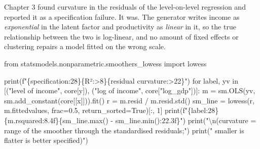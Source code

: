 \documentclass[
  letterpaper,
  10pt,
  twoside,
  openright,
  numbers=noenddot,
  chapterprefix=true]{scrbook}
\newenvironment{Shaded}{}{}
\newcommand{\BuiltInTok}[1]{\textcolor[rgb]{0.84,0.23,0.29}{#1}}
\newcommand{\CharTok}[1]{\textcolor[rgb]{0.01,0.18,0.38}{#1}}
\newcommand{\ControlFlowTok}[1]{\textcolor[rgb]{0.84,0.23,0.29}{#1}}
\newcommand{\DecValTok}[1]{\textcolor[rgb]{0.00,0.36,0.77}{#1}}
\newcommand{\FloatTok}[1]{\textcolor[rgb]{0.00,0.36,0.77}{#1}}
\newcommand{\ImportTok}[1]{\textcolor[rgb]{0.01,0.18,0.38}{#1}}
\newcommand{\KeywordTok}[1]{\textcolor[rgb]{0.84,0.23,0.29}{#1}}
\newcommand{\NormalTok}[1]{\textcolor[rgb]{0.14,0.16,0.18}{#1}}
\newcommand{\OperatorTok}[1]{\textcolor[rgb]{0.14,0.16,0.18}{#1}}
\newcommand{\SpecialCharTok}[1]{\textcolor[rgb]{0.00,0.36,0.77}{#1}}
\newcommand{\SpecialStringTok}[1]{\textcolor[rgb]{0.01,0.18,0.38}{#1}}
\newcommand{\StringTok}[1]{\textcolor[rgb]{0.01,0.18,0.38}{#1}}
\newcommand{\VariableTok}[1]{\textcolor[rgb]{0.89,0.38,0.04}{#1}}
\begin{document}
Chapter 3 found curvature in the residuals of the level-on-level
regression and reported it as a specification failure. It was. The
generator writes income as \emph{exponential} in the latent factor and
productivity as \emph{linear} in it, so the true relationship between
the two is log-linear, and no amount of fixed effects or clustering
repairs a model fitted on the wrong scale.

\label{check-logform}
\begin{Shaded}
\begin{Highlighting}[]
\ImportTok{from}\NormalTok{ statsmodels.nonparametric.smoothers\_lowess }\ImportTok{import}\NormalTok{ lowess}

\BuiltInTok{print}\NormalTok{(}\SpecialStringTok{f"}\SpecialCharTok{\{}\StringTok{\textquotesingle{}specification\textquotesingle{}}\SpecialCharTok{:28\}\{}\StringTok{\textquotesingle{}R²\textquotesingle{}}\SpecialCharTok{:\textgreater{}8\}\{}\StringTok{\textquotesingle{}residual curvature\textquotesingle{}}\SpecialCharTok{:\textgreater{}22\}}\SpecialStringTok{"}\NormalTok{)}
\ControlFlowTok{for}\NormalTok{ label, yv }\KeywordTok{in}\NormalTok{ [(}\StringTok{"level of income"}\NormalTok{, core[y]), (}\StringTok{"log of income"}\NormalTok{, core[}\StringTok{"log\_gdp"}\NormalTok{])]:}
\NormalTok{    m }\OperatorTok{=}\NormalTok{ sm.OLS(yv, sm.add\_constant(core[[x]])).fit()}
\NormalTok{    r }\OperatorTok{=}\NormalTok{ m.resid }\OperatorTok{/}\NormalTok{ m.resid.std()}
\NormalTok{    sm\_line }\OperatorTok{=}\NormalTok{ lowess(r, m.fittedvalues, frac}\OperatorTok{=}\FloatTok{0.5}\NormalTok{, return\_sorted}\OperatorTok{=}\VariableTok{True}\NormalTok{)[:, }\DecValTok{1}\NormalTok{]}
    \BuiltInTok{print}\NormalTok{(}\SpecialStringTok{f"}\SpecialCharTok{\{}\NormalTok{label}\SpecialCharTok{:28\}\{}\NormalTok{m}\SpecialCharTok{.}\NormalTok{rsquared}\SpecialCharTok{:8.4f\}\{}\NormalTok{sm\_line}\SpecialCharTok{.}\BuiltInTok{max}\NormalTok{() }\OperatorTok{{-}}\NormalTok{ sm\_line}\SpecialCharTok{.}\BuiltInTok{min}\NormalTok{()}\SpecialCharTok{:22.3f\}}\SpecialStringTok{"}\NormalTok{)}
\BuiltInTok{print}\NormalTok{(}\StringTok{"}\CharTok{\textbackslash{}n}\StringTok{(curvature = range of the smoother through the standardised residuals;"}\NormalTok{)}
\BuiltInTok{print}\NormalTok{(}\StringTok{" smaller is flatter is better specified)"}\NormalTok{)}


\end{Highlighting}
\end{Shaded}
\end{document}
